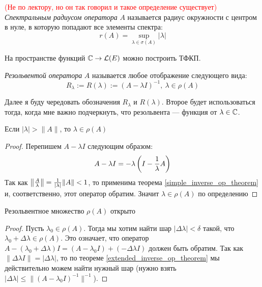 \begin{definition} \textcolor{red}{(Не по лектору, но он так говорил и такое определение существует)}
	\textit{Спектральным радиусом оператора} $A$ называется радиус окружности с центром в нуле, в которую попадают все элементы спектра:
	\[
		r(A) = \sup_{\lambda \in \sigma(A)} |\lambda|
	\]
\end{definition}

\begin{proposition}
	На пространстве функций $\mathbb{C} \to \mathcal{L}(E)$ можно построить ТФКП.
\end{proposition}

\begin{definition}
	\textit{Резольвентой оператора} $A$ называется любое отображение следующего вида:
	\[
		R_\lambda := R(\lambda) := (A - \lambda I)^{-1},\ \lambda \in \rho(A)
	\]
\end{definition}

\begin{anote}
	Далее я буду чередовать обозначения $R_\lambda$ и $R(\lambda)$. Второе будет использоваться тогда, когда мне важно подчеркнуть, что резольвента --- функция от $\lambda \in \mathbb{C}$.
\end{anote}

\begin{proposition} \label{prop10_for_radius}
	Если $|\lambda| > \|A\|$, то $\lambda \in \rho(A)$
\end{proposition}

\begin{proof}
	Перепишем $A - \lambda I$ следующим образом:
	\[
		A - \lambda I = -\lambda\left(I - \frac{1}{\lambda}A\right)
	\]
	Так как $\left\|\frac{A}{\lambda}\right\| = \frac{1}{|\lambda|}\|A\| < 1$, то применима теорема \ref{simple_inverse_op_theorem} и, соответственно, этот оператор обратим. Значит $\lambda \in \rho(A)$ по определению
\end{proof}

\begin{proposition}
	Резольвентное множество $\rho(A)$ открыто
\end{proposition}

\begin{proof}
	Пусть $\lambda_0 \in \rho(A)$. Тогда мы хотим найти шар $|\Delta \lambda| < \delta$ такой, что $\lambda_0 + \Delta \lambda \in \rho(A)$. Это означает, что оператор $A - (\lambda_0 + \Delta \lambda)I = (A - \lambda_0 I) + (-\Delta \lambda I)$ должен быть обратим. Так как $\|\Delta \lambda I\| = |\Delta \lambda|$, то по теореме \ref{extended_inverse_op_theorem} мы действительно можем найти нужный шар (нужно взять $|\Delta \lambda| \le \|(A - \lambda_0 I)^{-1}\|^{-1}$).
\end{proof}

